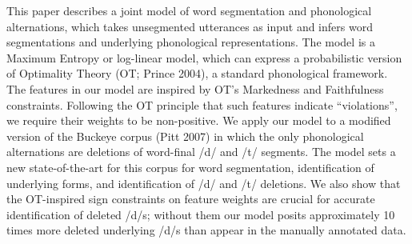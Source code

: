 This paper describes a joint model of word segmentation and phonological alternations, which takes unsegmented utterances as input and infers word segmentations and underlying phonological representations. The model is a Maximum Entropy or log-linear model, which can express a probabilistic version of Optimality Theory (OT; Prince 2004), a standard phonological framework. The features in our model are inspired by OT's Markedness and Faithfulness constraints. Following the OT principle that such features indicate ``violations'', we require their weights to be non-positive. We apply our model to a modified version of the Buckeye corpus (Pitt 2007) in which the only phonological alternations are deletions of word-final /d/ and /t/ segments. The model sets a new state-of-the-art for this corpus for word segmentation, identification of underlying forms, and identification of /d/ and /t/ deletions. We also show that the OT-inspired sign constraints on feature weights are crucial for accurate identification of deleted /d/s; without them our model posits approximately 10 times more deleted underlying /d/s than appear in the manually annotated data.
